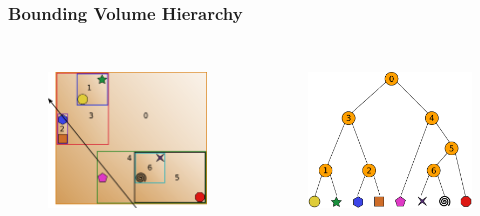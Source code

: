 \documentclass{beamer}
\begin{document}
\begin{frame}
  \frametitle{Bounding Volume Hierarchy}
  
\begin{columns}[t]

\begin{figure}
\includegraphics[height=45mm]{primitive-box-ray.png}
\end{figure}

\begin{figure}
\includegraphics[height=45mm]{primitive_tree_narrow.png}
\end{figure}
\end{columns}
\end{frame}
\end{document}
